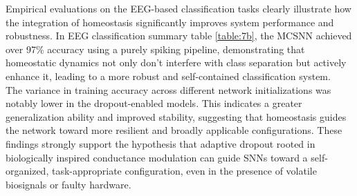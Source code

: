\noindent Empirical evaluations on the EEG-based classification tasks clearly illustrate how the integration of homeostasis significantly improves system performance and robustness. In EEG classification summary table \ref{table:7b}, the MCSNN achieved over 97\% accuracy using a purely spiking pipeline, demonstrating that homeostatic dynamics not only don't interfere with class separation but actively enhance it, leading to a more robust and self-contained classification system.\\

\noindent The variance in training accuracy across different network initializations was notably lower in the dropout-enabled models. This indicates a greater generalization ability and improved stability, suggesting that homeostasis guides the network toward more resilient and broadly applicable configurations. These findings strongly support the hypothesis that adaptive dropout rooted in biologically inspired conductance modulation can guide SNNs toward a self-organized, task-appropriate configuration, even in the presence of volatile biosignals or faulty hardware.\\

\begin{table}[ht]
    \centering
    \caption{Classification accuracy (\%) for each stimulus class using PCA, t-SNE, and UMAP embeddings followed by logistic regression.}
    \label{table:7b}
\end{table}


